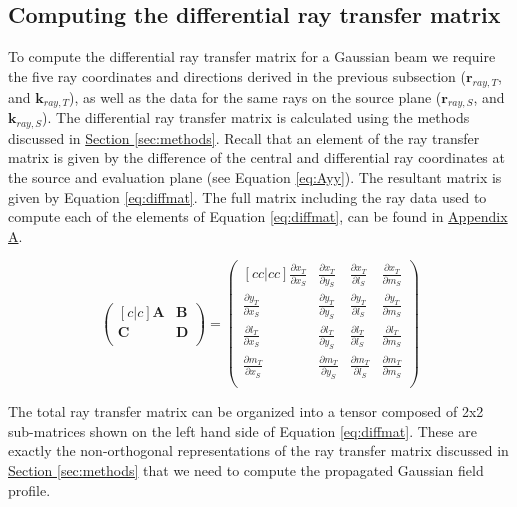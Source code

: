 \subsection{Computing the differential ray transfer matrix}
To compute the differential ray transfer matrix for a Gaussian beam we require the five ray coordinates and directions derived in the previous subsection ($\mathbf{r}_{ray,T}$, and $\mathbf{k}_{ray,T}$), as well as the data for the same rays on the source plane ($\mathbf{r}_{ray,S}$, and $\mathbf{k}_{ray,S}$). The differential ray transfer matrix is calculated using the methods discussed in \hyperref[sec:methods]{Section \ref{sec:methods}}. Recall that an element of the ray transfer matrix is given by the difference of the central and differential ray coordinates at the source and evaluation plane (see Equation \ref{eq:Ayy}). The resultant matrix is given by Equation \ref{eq:diffmat}. The full matrix including the ray data used to compute each of the elements of Equation \ref{eq:diffmat}, can be found in \hyperref[sec:appendixA]{Appendix A}.

\begin{center}
\begin{equation}
    \begin{pmatrix}[c | c]
        \mathbf{A} & \mathbf{B} \\
        \hline
        \mathbf{C} & \mathbf{D} \\
    \end{pmatrix} 
    =
    \begin{pmatrix}[c c | c c ]
    \frac{\partial x_T}{\partial x_S} & \frac{\partial x_T}{\partial y_S} & \frac{\partial x_T}{\partial l_S} & \frac{\partial x_T}{\partial m_S}  \\
    \frac{\partial y_T}{\partial x_S} & \frac{\partial y_T}{\partial y_S} & \frac{\partial y_T}{\partial l_S} & \frac{\partial y_T}{\partial m_S}  \\
    \hline 
    \frac{\partial l_T}{\partial x_S} & \frac{\partial l_T}{\partial y_S} & \frac{\partial l_T}{\partial l_S} & \frac{\partial l_T}{\partial m_S} \\
    \frac{\partial m_T}{\partial x_S} & \frac{\partial m_T}{\partial y_S} & \frac{\partial m_T}{\partial l_S} & \frac{\partial m_T}{\partial m_S} \\
    \end{pmatrix}
    \label{eq:diffmat}
\end{equation}
\end{center}

The total ray transfer matrix can be organized into a tensor composed of 2x2 sub-matrices shown on the left hand side of Equation \ref{eq:diffmat}. These are exactly the non-orthogonal representations of the ray transfer matrix discussed in \hyperref[sec:methods]{Section \ref{sec:methods}} that we need to compute the propagated Gaussian field profile.

